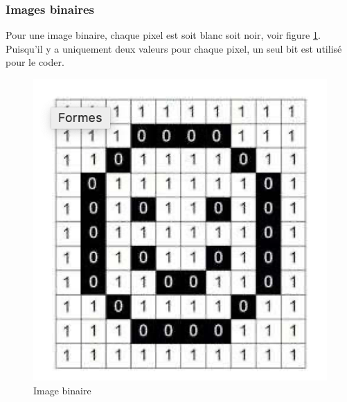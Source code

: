 \documentclass[a4paper,12pt]{report}
\begin{document}
\subsubsection{Images binaires}
Pour une image binaire, chaque pixel est soit blanc soit noir, voir figure \ref{fig:ImageBinaire}. Puisqu'il y a uniquement deux valeurs pour chaque pixel, un seul bit est utilisé pour le coder.
\begin{figure}[!ht]
	\centering
	\includegraphics[scale=0.5]{ImageBinaire}
	\caption{Image binaire} \label{fig:ImageBinaire}
\end{figure}

\end{document}

